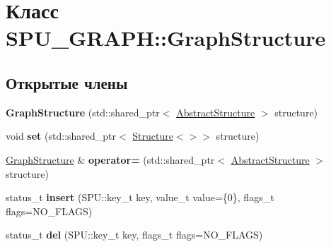 \hypertarget{class_s_p_u___g_r_a_p_h_1_1_graph_structure}{}\section{Класс S\+P\+U\+\_\+\+G\+R\+A\+PH\+:\+:Graph\+Structure}
\label{class_s_p_u___g_r_a_p_h_1_1_graph_structure}
\subsection*{Открытые члены}
\begin{DoxyCompactItemize}
\item 
\mbox{\label{class_s_p_u___g_r_a_p_h_1_1_graph_structure_ae1e2535a2ac2bfecb0bfbf68f4635d75}} 
{\bfseries Graph\+Structure} (std\+::shared\+\_\+ptr$<$ \hyperlink{class_s_p_u_1_1_abstract_structure}{Abstract\+Structure} $>$ structure)
\item 
\mbox{\label{class_s_p_u___g_r_a_p_h_1_1_graph_structure_a7a5ad16ffbf2d3d50e5a0453d5c9b225}} 
void {\bfseries set} (std\+::shared\+\_\+ptr$<$ \hyperlink{class_s_p_u_1_1_structure}{Structure}$<$$>$$>$ structure)
\item 
\mbox{\label{class_s_p_u___g_r_a_p_h_1_1_graph_structure_a6f2f2bfb7a31de1d5eaa6e10c70b1fc1}} 
\hyperlink{class_s_p_u___g_r_a_p_h_1_1_graph_structure}{Graph\+Structure} \& {\bfseries operator=} (std\+::shared\+\_\+ptr$<$ \hyperlink{class_s_p_u_1_1_abstract_structure}{Abstract\+Structure} $>$ structure)
\item 
\mbox{\label{class_s_p_u___g_r_a_p_h_1_1_graph_structure_ae1562708dc137727326734aa3ce6827e}} 
status\+\_\+t {\bfseries insert} (S\+P\+U\+::key\+\_\+t key, value\+\_\+t value=\{0\}, flags\+\_\+t flags=N\+O\+\_\+\+F\+L\+A\+GS)
\item 
\mbox{\label{class_s_p_u___g_r_a_p_h_1_1_graph_structure_a46058b12a8024e7d9c32e995350c61d9}} 
status\+\_\+t {\bfseries del} (S\+P\+U\+::key\+\_\+t key, flags\+\_\+t flags=N\+O\+\_\+\+F\+L\+A\+GS)
\item 

\end{DoxyCompactItemize}
